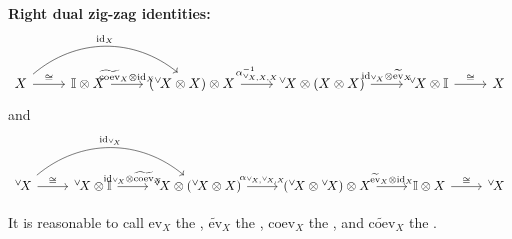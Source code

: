 \begin{definition}
\noindent\textbf{Right dual zig-zag identities:}
$$\begin{tikzcd}
X \arrow[r, "\cong"] \arrow[rr, bend left=40, "\mathrm{id}_X"] & 
\mathbb{I} \otimes X \arrow[r, "\widetilde{\mathrm{coev}}_X \otimes \mathrm{id}_X"] & 
({}^{\vee}\!X \otimes X) \otimes X \arrow[r, "\alpha^{-1}_{{}^{\vee}\!X, X, X}"] & 
{}^{\vee}\!X \otimes (X \otimes X) \arrow[r, "\mathrm{id}_{{}^{\vee}\!X} \otimes \widetilde{\mathrm{ev}}_X"] & 
{}^{\vee}\!X \otimes \mathbb{I} \arrow[r, "\cong"] & X
\end{tikzcd}$$
and
$$\begin{tikzcd}
{}^{\vee}\!X \arrow[r, "\cong"] \arrow[rr, bend left=40, "\mathrm{id}_{{}^{\vee}\!X}"] & 
{}^{\vee}\!X \otimes \mathbb{I} \arrow[r, "\mathrm{id}_{{}^{\vee}\!X} \otimes \widetilde{\mathrm{coev}}_X"] & 
{}^{\vee}\!X \otimes ({}^{\vee}\!X \otimes X) \arrow[r, "\alpha_{{}^{\vee}\!X, {}^{\vee}\!X, X}"] & 
({}^{\vee}\!X \otimes {}^{\vee}\!X) \otimes X \arrow[r, "\widetilde{\mathrm{ev}}_X \otimes \mathrm{id}_X"] & 
\mathbb{I} \otimes X \arrow[r, "\cong"] & {}^{\vee}\!X
\end{tikzcd}$$

It is reasonable to call $\mathrm{ev}_X$ the , $\widetilde{\mathrm{ev}}_X$ the , $\mathrm{coev}_X$ the , and $\widetilde{\mathrm{coev}}_X$ the . 

\end{definition}